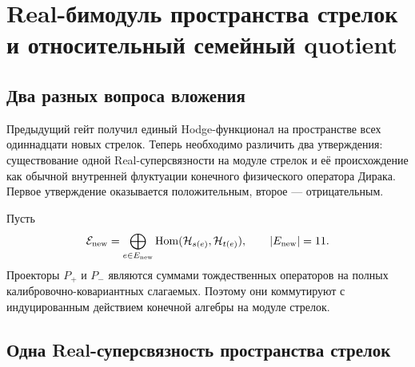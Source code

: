\chapter{Real-бимодуль пространства стрелок и относительный семейный quotient}
\label{ch:v7-real-arrow-bimodule-forest-quotient-gate}

\section{Два разных вопроса вложения}

Предыдущий гейт получил единый Hodge-функционал на пространстве всех
одиннадцати новых стрелок. Теперь необходимо различить два утверждения:
существование одной Real-суперсвязности на модуле стрелок и её происхождение
как обычной внутренней флуктуации конечного физического оператора Дирака.
Первое утверждение оказывается положительным, второе --- отрицательным.

Пусть
\begin{equation}
 \mathcal E_{\rm new}
 =\bigoplus_{e\in E_{\rm new}}
 \operatorname{Hom}(\mathcal H_{s(e)},\mathcal H_{t(e)}),
 \qquad |E_{\rm new}|=11.
 \label{eq:v7-real-arrow-edge-module}
\end{equation}
Проекторы $P_+$ и $P_-$ являются суммами тождественных операторов на
полных калибровочно-ковариантных слагаемых. Поэтому они коммутируют с
индуцированным действием конечной алгебры на модуле стрелок.

\section{Одна Real-суперсвязность пространства стрелок}

